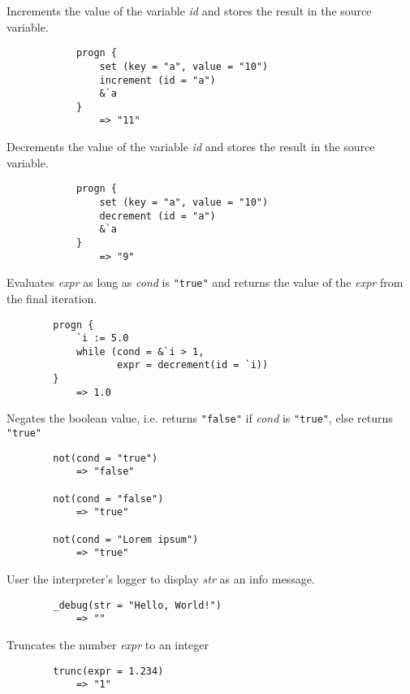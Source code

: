 \begin{multicols*}{2}
	Increments the value of the variable \textit{id} and stores the result in the source variable.
	\begin{verbatim}
			progn {
			    set (key = "a", value = "10")
			    increment (id = "a")
			    &`a
			}
			    => "11"
	\end{verbatim}
	Decrements the value of the variable \textit{id} and stores the result in the source variable.
	\begin{verbatim}
			progn {
			    set (key = "a", value = "10")
			    decrement (id = "a")
			    &`a
			}
			    => "9"
	\end{verbatim}
	Evaluates \textit{expr} as long as \textit{cond} is \verb|"true"| and returns the value of the \textit{expr}
	from the final iteration.
	\begin{verbatim}
		progn {
		    `i := 5.0
		    while (cond = &`i > 1,
		           expr = decrement(id = `i))
		}
		    => 1.0
	\end{verbatim}
	Negates the boolean value, i.e. returns \verb|"false"| if \textit{cond} is \verb|"true"|, else returns \verb|"true"|
	\begin{verbatim}
		not(cond = "true")
		    => "false"

		not(cond = "false")
		    => "true"

		not(cond = "Lorem ipsum")
		    => "true"
	\end{verbatim}
	User the interpreter's logger to display \textit{str} as an info message.
	\begin{verbatim}
		_debug(str = "Hello, World!")
		    => ""
	\end{verbatim}
	Truncates the number \textit{expr} to an integer
	\begin{verbatim}
		trunc(expr = 1.234)
		    => "1"
	\end{verbatim}
\end{multicols*}
\newpage